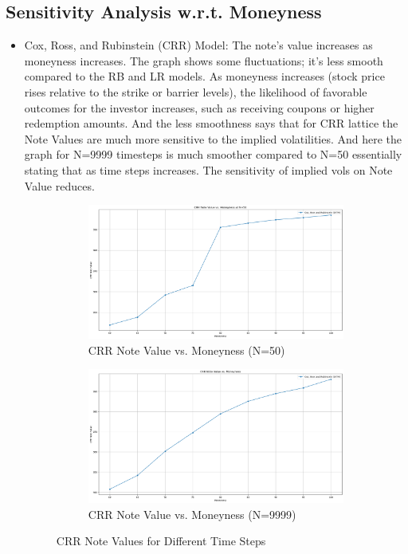 \documentclass[12pt,a4paper]{article}
\begin{document}
\subsection*{Sensitivity Analysis w.r.t. Moneyness}
\begin{itemize}
\item Cox, Ross, and Rubinstein (CRR) Model:
The note's value increases as moneyness increases. The graph shows some fluctuations; it's less smooth compared to the RB and LR models. As moneyness increases (stock price rises relative to the strike or barrier levels), the likelihood of favorable outcomes for the investor increases, such as receiving coupons or higher redemption amounts. And the less smoothness says that for CRR lattice the Note Values are much more sensitive to the implied volatilities. And here the graph for N=9999 timesteps is much smoother compared to N=50 essentially stating that as time steps increases. The sensitivity of implied vols on Note Value reduces.
\begin{figure}[htbp]
    \centering
    \begin{subfigure}[b]{0.48\textwidth}
        \centering
        \includegraphics[width=\textwidth]{Images/sen_crr_50.png}
        \caption{CRR Note Value vs. Moneyness (N=50)}
        \label{fig:crr_n50}
    \end{subfigure}
    \hfill
    \begin{subfigure}[b]{0.48\textwidth}
        \centering
        \includegraphics[width=\textwidth]{Images/sen_crr.png}
        \caption{CRR Note Value vs. Moneyness (N=9999)}
        \label{fig:crr_n9999}
    \end{subfigure}
    \caption{CRR Note Values for Different Time Steps}
    \label{fig:crr_comparison}
\end{figure}


\end{itemize}
\end{document}
